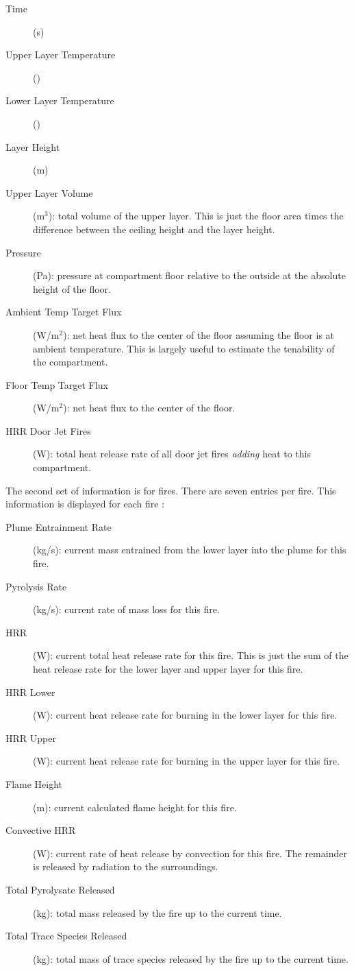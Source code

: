 \begin{description}
\item[Time] (s)
\item[Upper Layer Temperature] (\degc)
\item[Lower Layer Temperature] (\degc)
\item[Layer Height]  (m)
\item[ Upper Layer Volume] (m$^3$): total volume of the upper layer. This is just the floor area times the difference between the ceiling height and the layer height.
\item[ Pressure] (Pa): pressure at compartment floor relative to the outside at the absolute height of the floor.
\item[Ambient Temp Target Flux] (W/m$^2$): net heat flux to the center of the floor assuming the floor is at ambient temperature.  This is largely useful to estimate the tenability of the compartment.
\item[Floor Temp Target Flux] (W/m$^2$): net heat flux to the center of the floor.
\item[HRR Door Jet Fires] (W): total heat release rate of all door jet fires \emph{adding} heat to this compartment.
\end{description}
The second set of information is for fires. There are seven entries per fire.  This information is displayed for each fire :
\begin{description}
\item[Plume Entrainment Rate] (kg/s): current mass entrained from the lower layer into the plume for this fire.
\item[Pyrolysis Rate] (kg/s): current rate of mass loss for this fire.
\item[HRR] (W): current total heat release rate for this fire. This is just the sum of the heat release rate for the lower layer and upper layer for this fire.
\item[HRR Lower] (W): current heat release rate for burning in the lower layer for this fire.
\item[HRR Upper] (W):  current heat release rate for burning in the upper layer for this fire.
\item[Flame Height] (m): current calculated flame height for this fire.
\item[Convective HRR] (W): current rate of heat release by convection for this fire.  The remainder is released by radiation to the surroundings.
\item[Total Pyrolysate Released] (kg): total mass released by the fire up to the current time.
\item[Total Trace Species Released] (kg): total mass of trace species released by the fire up to the current time.
\end{description}

